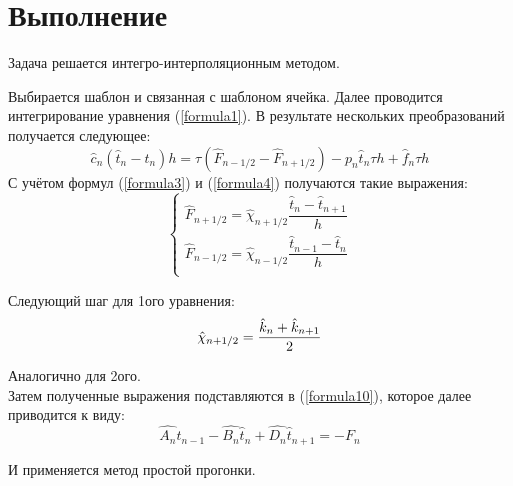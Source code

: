 \chapter*{Выполнение}

Задача решается интегро-интерполяционным методом.

Выбирается шаблон и связанная с шаблоном ячейка. Далее проводится интегрирование уравнения (\ref{formula1}). В результате нескольких преобразований получается следующее:
\begin{equation}\label{formula10}
	\hat{c}_n(\hat{t}_n - t_n)h = \tau(\hat{F}_{n - 1/2} - \hat{F}_{n + 1/2}) - p_n\hat{t}_n\tau h + \hat{f}_n \tau h
\end{equation}
С учётом формул (\ref{formula3}) и (\ref{formula4}) получаются такие выражения:
\begin{equation}\label{formula11}
	\begin{cases}
	\hat{F}_{n+1/2} = \hat{\chi}_{n+1/2} \dfrac{\hat{t}_{n} - \hat{t}_{n+1}}{h} \\ 
	\hat{F}_{n-1/2} = \hat{\chi}_{n-1/2} \dfrac{\hat{t}_{n-1} - \hat{t}_{n}}{h} \\
	\end{cases}
\end{equation}

Следующий шаг для 1ого уравнения:
\begin{equation}\label{formula12}
		\hat{\chi}_{n+1/2} = \dfrac{\hat{k}_n + \hat{k}_{n+1}}{2} \\
\end{equation}

Аналогично для 2ого.\\
Затем полученные выражения подставляются в (\ref{formula10}), которое далее приводится к виду:
\begin{equation*}
	\hat{A_n} \hat{t}_{n-1} - \hat{B_n} \hat{t}_{n} + \hat{D_n} \hat{t}_{n+1} = -F_n
\end{equation*}

И применяется метод простой прогонки.